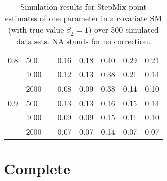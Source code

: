 \documentclass{article}
\begin{document}
\begin{table}[ht]
\begin{tabular}{lll |rrrrr}
  0.8       & 500  &        &   0.16 &   0.18 &   0.40 &    0.29 &   0.21 \\ 
            & 1000 &        &   0.12 &   0.13 &   0.38 &    0.21 &   0.14 \\ 
            & 2000 &        &   0.08 &   0.09 &   0.38 &    0.14 &   0.10 \\ 
  0.9       & 500  &        &   0.13 &   0.13 &   0.16 &    0.15 &   0.14 \\ 
            & 1000 &        &   0.09 &   0.09 &   0.15 &    0.11 &   0.10 \\ 
            & 2000 &        &   0.07 &   0.07 &   0.14 &    0.07 &   0.07 \\ 
   \hline
\end{tabular}
\caption{Simulation results for StepMix point estimates of one parameter in a covariate SM
(with true value $\beta_2 = 1$) over 500 simulated data sets. NA stands for no correction.
}

\end{table}

\newpage
\section{Complete}
\end{document}
